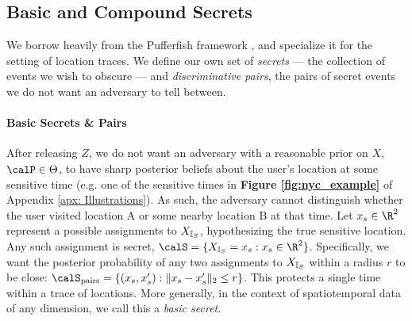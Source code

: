 \subsection{Basic and Compound Secrets}

We borrow heavily from the Pufferfish framework \citep{pufferfish}, and specialize it for the setting of location traces. We define our own set of \emph{secrets} --- the collection of events we wish to obscure --- and \emph{discriminative pairs}, the pairs of secret events we do not want an adversary to tell between. 

\paragraph{Basic Secrets \& Pairs} 
After releasing $Z$, we do not want an adversary with a reasonable prior on $X$, $\calP \in \Theta$, to have sharp posterior beliefs about the user's location at some sensitive time (e.g. one of the sensitive times in \textbf{Figure \ref{fig:nyc_example}} of Appendix \ref{apx: Illustrations}). As such, the adversary cannot distinguish whether the user visited location A or some nearby location B at that time. Let $x_s\in \R^2$ represent a possible assignments to ${X_{\mathbb{I}_S}}$, hypothesizing the true sensitive location. Any such assignment is secret, $\calS = \{ \Xs = x_s  : x_s \in \R^2\}$. Specifically, we want the posterior probability of any two assignments to ${X_{\mathbb{I}_S}}$ within a radius $r$ to be close: $\Spairs = \{(x_s, x_s'):\|x_s - x_s'\|_2 \leq r\}$. This protects a single time within a trace of locations. More generally, in the context of spatiotemporal data of any dimension, we call this a \emph{basic secret}. 

